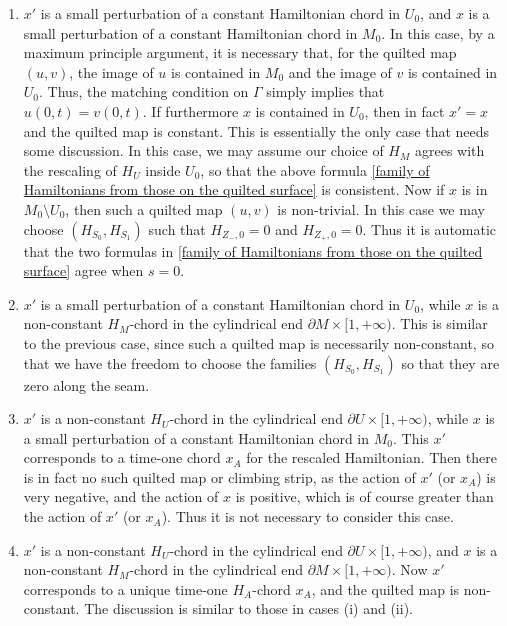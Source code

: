 \documentclass{amsart}
\numberwithin{equation}{section}
\numberwithin{figure}{section}
\begin{document}
\begin{enumerate}[label=(\roman*)]

\item $x'$ is a small perturbation of a constant Hamiltonian chord in $U_{0}$, and $x$ is a small perturbation of a constant Hamiltonian chord in $M_{0}$. In this case, by a maximum principle argument, it is necessary that, for the quilted map $(u, v)$, the image of $u$ is contained in $M_{0}$ and the image of $v$ is contained in $U_{0}$. Thus, the matching condition on $\Gamma$ simply implies that $u(0, t) = v(0, t)$. If furthermore $x$ is contained in $U_{0}$, then in fact $x' = x$ and the quilted map is constant. This is essentially the only case that needs some discussion. In this case, we may assume our choice of $H_{M}$ agrees with the rescaling of $H_{U}$ inside $U_{0}$, so that the above formula \eqref{family of Hamiltonians from those on the quilted surface} is consistent. Now if $x$ is in $M_{0} \setminus U_{0}$, then such a quilted map $(u, v)$ is non-trivial. In this case we may choose $(H_{S_{0}}, H_{S_{1}})$ such that $H_{Z_{-}, 0} = 0$ and $H_{Z_{+}, 0} = 0$. Thus it is automatic that the two formulas in \eqref{family of Hamiltonians from those on the quilted surface} agree when $s = 0$.

\item $x'$ is a small perturbation of a constant Hamiltonian chord in $U_{0}$, while $x$ is a non-constant $H_{M}$-chord in the cylindrical end $\partial M \times [1, +\infty)$. This is similar to the previous case, since such a quilted map is necessarily non-constant, so that we have the freedom to choose the families $(H_{S_{0}}, H_{S_{1}})$ so that they are zero along the seam.

\item $x'$ is a non-constant $H_{U}$-chord in the cylindrical end $\partial U \times [1, +\infty)$, while $x$ is a small perturbation of a constant Hamiltonian chord in $M_{0}$. This $x'$ corresponds to a time-one chord $x_{A}$ for the rescaled Hamiltonian. Then there is in fact no such quilted map or climbing strip, as the action of $x'$ (or $x_{A}$) is very negative, and the action of $x$ is positive, which is of course greater than the action of $x'$ (or $x_{A}$). Thus it is not necessary to consider this case.

\item $x'$ is a non-constant $H_{U}$-chord in the cylindrical end $\partial U \times [1, +\infty)$, and $x$ is a non-constant $H_{M}$-chord in the cylindrical end $\partial M \times [1, +\infty)$. Now $x'$ corresponds to a unique time-one $H_{A}$-chord $x_{A}$, and the quilted map is non-constant. The discussion is similar to those in cases (i) and (ii).

\end{enumerate}
\end{document}
